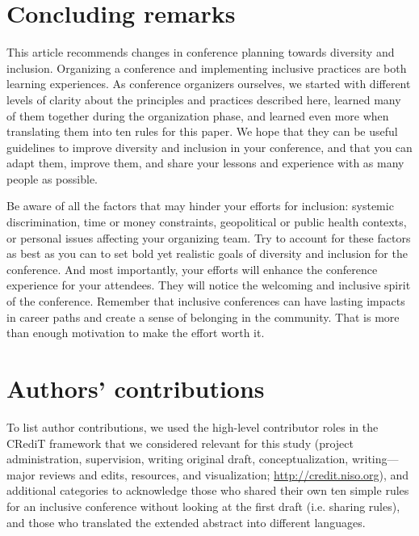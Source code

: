 \documentclass[10pt,letterpaper]{article}
\begin{document}
\section*{Concluding remarks}

This article recommends changes in conference planning towards diversity and inclusion. 
Organizing a conference and implementing inclusive practices are both learning experiences.
As conference organizers ourselves, we started with different levels of clarity about the principles and practices described here, learned many of them together during the organization phase, and learned even more when translating them into ten rules for this paper. 
We hope that they can be useful guidelines to improve diversity and inclusion in your conference, and that you can adapt them, improve them, and share your lessons and experience with as many people as possible. 

Be aware of all the factors that may hinder your efforts for inclusion: systemic discrimination, time or money constraints, geopolitical or public health contexts, or personal issues affecting your organizing team. 
Try to account for these factors as best as you can to set bold yet realistic goals of diversity and inclusion for the conference.
And most importantly, your efforts will enhance the conference experience for your attendees. 
They will notice the welcoming and inclusive spirit of the conference. 
Remember that inclusive conferences can have lasting impacts in career paths and create a sense of belonging in the community.
That is more than enough motivation to make the effort worth it.


\section*{Authors' contributions}

To list author contributions, we used the high-level contributor roles in the CRediT framework that we considered relevant for this study (project administration, supervision, writing original draft, conceptualization, writing—major reviews and edits, resources, and visualization; \url{http://credit.niso.org}), and additional categories to acknowledge those who shared their own ten simple rules for an inclusive conference without looking at the first draft (i.e. sharing rules), and those who translated the extended abstract into different languages.
\end{document}
